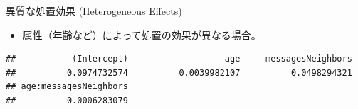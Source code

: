 \documentclass[
  ignorenonframetext,
]{beamer}
\newenvironment{Shaded}{\begin{snugshade}}{\end{snugshade}}
\newcommand{\AttributeTok}[1]{\textcolor[rgb]{0.77,0.63,0.00}{#1}}
\newcommand{\CommentTok}[1]{\textcolor[rgb]{0.56,0.35,0.01}{\textit{#1}}}
\newcommand{\DecValTok}[1]{\textcolor[rgb]{0.00,0.00,0.81}{#1}}
\newcommand{\FunctionTok}[1]{\textcolor[rgb]{0.00,0.00,0.00}{#1}}
\newcommand{\NormalTok}[1]{#1}
\newcommand{\OtherTok}[1]{\textcolor[rgb]{0.56,0.35,0.01}{#1}}
\newcommand{\SpecialCharTok}[1]{\textcolor[rgb]{0.00,0.00,0.00}{#1}}
\newcommand{\StringTok}[1]{\textcolor[rgb]{0.31,0.60,0.02}{#1}}
\providecommand{\tightlist}{%
  \setlength{\itemsep}{0pt}\setlength{\parskip}{0pt}}
\begin{document}
\begin{frame}[fragile]{異質な処置効果 (Heterogeneous Effects)}
\protect\hypertarget{ux7570ux8ceaux306aux51e6ux7f6eux52b9ux679c-heterogeneous-effects}{}
\begin{itemize}
\tightlist
\item
  属性（年齢など）によって処置の効果が異なる場合。
\end{itemize}

\scriptsize

\begin{Shaded}
\end{Shaded}

\begin{verbatim}
##           (Intercept)                   age     messagesNeighbors 
##          0.0974732574          0.0039982107          0.0498294321 
## age:messagesNeighbors 
##          0.0006283079
\end{verbatim}

\normalsize
\end{frame}
\end{document}
